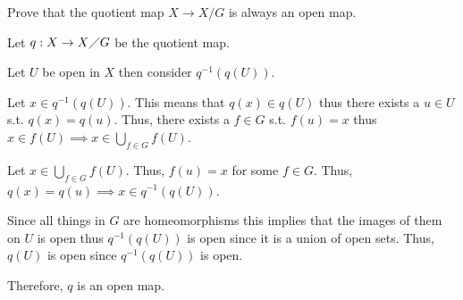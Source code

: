 \documentclass[12pt, letterpaper]{article}
\begin{document}
\begin{subproblem}{}
    Prove that the quotient map $X \to X/G$ is always an open map.
\end{subproblem}
\begin{problemproof}
    Let $q : X \to X \diagup G$ be the quotient map.

    Let $U$ be open in $X$ then consider $q^{-1}(q(U))$.

    Let $x \in q^{-1}(q(U))$. This means that $q(x) \in q(U)$ thus there exists a $u \in U$ s.t. $q(x)=q(u)$. Thus, there exists a $f \in G$ s.t. $f(u)=x$ thus $x \in f(U) \implies x \in \displaystyle\bigcup_{f \in G}f(U)$.

    Let $x \in \displaystyle\bigcup_{f \in G}f(U)$. Thus, $f(u)=x$ for some $f \in G$. Thus, $q(x)=q(u) \implies x \in q^{-1}(q(U))$.

    Since all things in $G$ are homeomorphisms this implies that the images of them on $U$ is open thus $q^{-1}(q(U))$ is open since it is a union of open sets. Thus, $q(U)$ is open since $q^{-1}(q(U))$ is open.

    Therefore, $q$ is an open map.
\end{problemproof}
\end{document}
